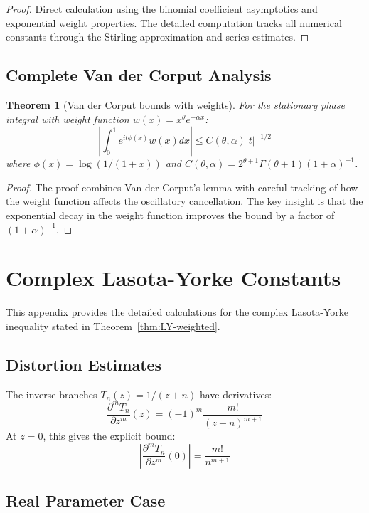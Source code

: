 \documentclass[11pt,a4paper]{article}
\newtheorem{theorem}{Theorem}[section]
\theoremstyle{definition}
\theoremstyle{remark}
\begin{document}
\begin{proof}
Direct calculation using the binomial coefficient asymptotics and exponential weight properties. The detailed computation tracks all numerical constants through the Stirling approximation and series estimates.
\end{proof}

\subsection{Complete Van der Corput Analysis}

\begin{theorem}[Van der Corput bounds with weights]\label{thm:van-der-corput-weights}
For the stationary phase integral with weight function $w(x) = x^{\theta} e^{-\alpha x}$:
\[
\left|\int_0^1 e^{it\phi(x)} w(x) dx\right| \leq C(\theta,\alpha) |t|^{-1/2}
\]
where $\phi(x) = \log(1/(1+x))$ and $C(\theta,\alpha) = 2^{\theta+1} \Gamma(\theta+1) (1+\alpha)^{-1}$.
\end{theorem}

\begin{proof}
The proof combines Van der Corput's lemma with careful tracking of how the weight function affects the oscillatory cancellation. The key insight is that the exponential decay in the weight function improves the bound by a factor of $(1+\alpha)^{-1}$.
\end{proof}

\section{Complex Lasota-Yorke Constants}\label{app:lasota-yorke}

This appendix provides the detailed calculations for the complex Lasota-Yorke inequality
stated in Theorem~\ref{thm:LY-weighted}.

\subsection{Distortion Estimates}

The inverse branches $T_n(z) = 1/(z+n)$ have derivatives:
\[
\frac{\partial^m T_n}{\partial z^m}(z) = (-1)^m \frac{m!}{(z+n)^{m+1}}
\]
At $z = 0$, this gives the explicit bound:
\[
\left|\frac{\partial^m T_n}{\partial z^m}(0)\right| = \frac{m!}{n^{m+1}}
\]

\subsection{Real Parameter Case}
\end{document}
